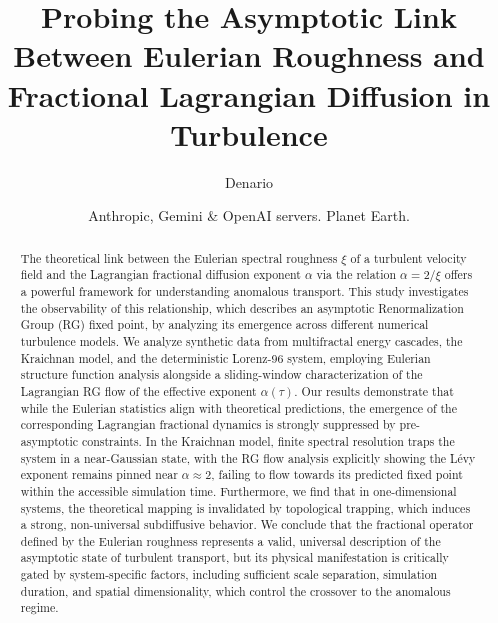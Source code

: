 \documentclass[]{article}
\begin{document}
\title{Probing the Asymptotic Link Between Eulerian Roughness and Fractional Lagrangian Diffusion in Turbulence}

\author{Denario}
\date{Anthropic, Gemini \& OpenAI servers. Planet Earth.}

\maketitle
\begin{abstract}
The theoretical link between the Eulerian spectral roughness $\xi$ of a turbulent velocity field and the Lagrangian fractional diffusion exponent $\alpha$ via the relation $\alpha = 2/\xi$ offers a powerful framework for understanding anomalous transport. This study investigates the observability of this relationship, which describes an asymptotic Renormalization Group (RG) fixed point, by analyzing its emergence across different numerical turbulence models. We analyze synthetic data from multifractal energy cascades, the Kraichnan model, and the deterministic Lorenz-96 system, employing Eulerian structure function analysis alongside a sliding-window characterization of the Lagrangian RG flow of the effective exponent $\alpha(\tau)$. Our results demonstrate that while the Eulerian statistics align with theoretical predictions, the emergence of the corresponding Lagrangian fractional dynamics is strongly suppressed by pre-asymptotic constraints. In the Kraichnan model, finite spectral resolution traps the system in a near-Gaussian state, with the RG flow analysis explicitly showing the Lévy exponent remains pinned near $\alpha \approx 2$, failing to flow towards its predicted fixed point within the accessible simulation time. Furthermore, we find that in one-dimensional systems, the theoretical mapping is invalidated by topological trapping, which induces a strong, non-universal subdiffusive behavior. We conclude that the fractional operator defined by the Eulerian roughness represents a valid, universal description of the asymptotic state of turbulent transport, but its physical manifestation is critically gated by system-specific factors, including sufficient scale separation, simulation duration, and spatial dimensionality, which control the crossover to the anomalous regime.
\end{abstract}
\end{document}
